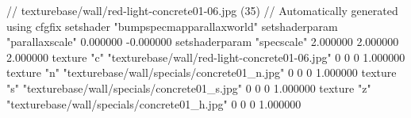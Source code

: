 // texturebase/wall/red-light-concrete01-06.jpg (35)
// Automatically generated using cfgfix
setshader "bumpspecmapparallaxworld"
setshaderparam "parallaxscale" 0.000000 -0.000000
setshaderparam "specscale" 2.000000 2.000000 2.000000
texture "c" "texturebase/wall/red-light-concrete01-06.jpg" 0 0 0 1.000000
texture "n" "texturebase/wall/specials/concrete01_n.jpg" 0 0 0 1.000000
texture "s" "texturebase/wall/specials/concrete01_s.jpg" 0 0 0 1.000000
texture "z" "texturebase/wall/specials/concrete01_h.jpg" 0 0 0 1.000000
